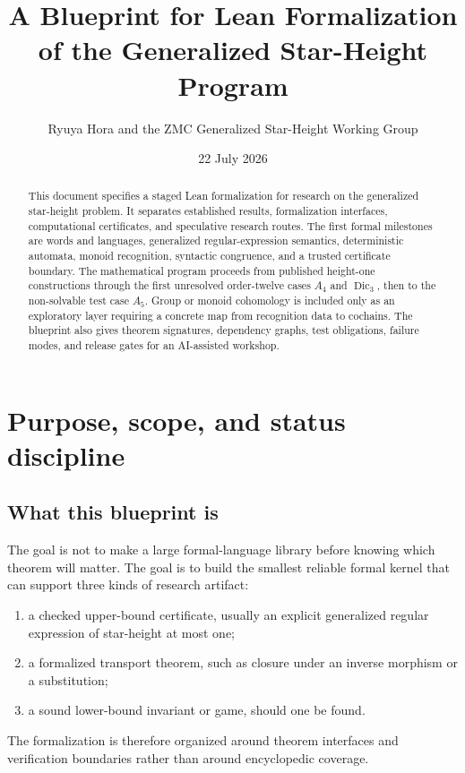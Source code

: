 \documentclass{amsart}
\title{A Blueprint for Lean Formalization of the Generalized Star-Height Program}
\author{Ryuya Hora and the ZMC Generalized Star-Height Working Group}
\date{22 July 2026}
\begin{document}
\begin{abstract}
This document specifies a staged Lean formalization for research on the generalized star-height problem.  It separates established results, formalization interfaces, computational certificates, and speculative research routes.  The first formal milestones are words and languages, generalized regular-expression semantics, deterministic automata, monoid recognition, syntactic congruence, and a trusted certificate boundary.  The mathematical program proceeds from published height-one constructions through the first unresolved order-twelve cases $A_4$ and $\operatorname{Dic}_3$, then to the non-solvable test case $A_5$.  Group or monoid cohomology is included only as an exploratory layer requiring a concrete map from recognition data to cochains.  The blueprint also gives theorem signatures, dependency graphs, test obligations, failure modes, and release gates for an AI-assisted workshop.
\end{abstract}
\maketitle
\tableofcontents

\section{Purpose, scope, and status discipline}

\subsection{What this blueprint is}

The goal is not to make a large formal-language library before knowing which theorem will matter.  The goal is to build the smallest reliable formal kernel that can support three kinds of research artifact:
\begin{enumerate}
  \item a checked upper-bound certificate, usually an explicit generalized regular expression of star-height at most one;
  \item a formalized transport theorem, such as closure under an inverse morphism or a substitution;
  \item a sound lower-bound invariant or game, should one be found.
\end{enumerate}
The formalization is therefore organized around theorem interfaces and verification boundaries rather than around encyclopedic coverage.
\end{document}
